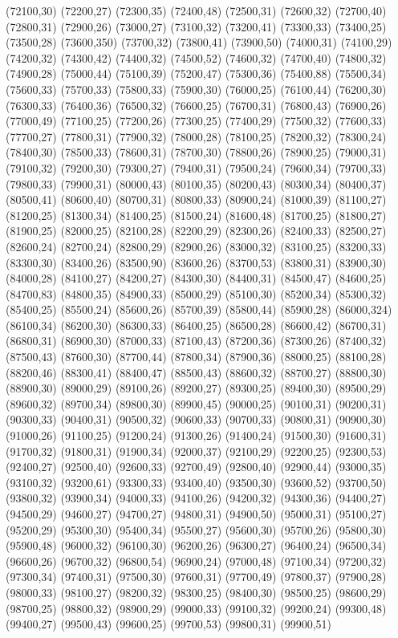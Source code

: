 (72100,30)
(72200,27)
(72300,35)
(72400,48)
(72500,31)
(72600,32)
(72700,40)
(72800,31)
(72900,26)
(73000,27)
(73100,32)
(73200,41)
(73300,33)
(73400,25)
(73500,28)
(73600,350)
(73700,32)
(73800,41)
(73900,50)
(74000,31)
(74100,29)
(74200,32)
(74300,42)
(74400,32)
(74500,52)
(74600,32)
(74700,40)
(74800,32)
(74900,28)
(75000,44)
(75100,39)
(75200,47)
(75300,36)
(75400,88)
(75500,34)
(75600,33)
(75700,33)
(75800,33)
(75900,30)
(76000,25)
(76100,44)
(76200,30)
(76300,33)
(76400,36)
(76500,32)
(76600,25)
(76700,31)
(76800,43)
(76900,26)
(77000,49)
(77100,25)
(77200,26)
(77300,25)
(77400,29)
(77500,32)
(77600,33)
(77700,27)
(77800,31)
(77900,32)
(78000,28)
(78100,25)
(78200,32)
(78300,24)
(78400,30)
(78500,33)
(78600,31)
(78700,30)
(78800,26)
(78900,25)
(79000,31)
(79100,32)
(79200,30)
(79300,27)
(79400,31)
(79500,24)
(79600,34)
(79700,33)
(79800,33)
(79900,31)
(80000,43)
(80100,35)
(80200,43)
(80300,34)
(80400,37)
(80500,41)
(80600,40)
(80700,31)
(80800,33)
(80900,24)
(81000,39)
(81100,27)
(81200,25)
(81300,34)
(81400,25)
(81500,24)
(81600,48)
(81700,25)
(81800,27)
(81900,25)
(82000,25)
(82100,28)
(82200,29)
(82300,26)
(82400,33)
(82500,27)
(82600,24)
(82700,24)
(82800,29)
(82900,26)
(83000,32)
(83100,25)
(83200,33)
(83300,30)
(83400,26)
(83500,90)
(83600,26)
(83700,53)
(83800,31)
(83900,30)
(84000,28)
(84100,27)
(84200,27)
(84300,30)
(84400,31)
(84500,47)
(84600,25)
(84700,83)
(84800,35)
(84900,33)
(85000,29)
(85100,30)
(85200,34)
(85300,32)
(85400,25)
(85500,24)
(85600,26)
(85700,39)
(85800,44)
(85900,28)
(86000,324)
(86100,34)
(86200,30)
(86300,33)
(86400,25)
(86500,28)
(86600,42)
(86700,31)
(86800,31)
(86900,30)
(87000,33)
(87100,43)
(87200,36)
(87300,26)
(87400,32)
(87500,43)
(87600,30)
(87700,44)
(87800,34)
(87900,36)
(88000,25)
(88100,28)
(88200,46)
(88300,41)
(88400,47)
(88500,43)
(88600,32)
(88700,27)
(88800,30)
(88900,30)
(89000,29)
(89100,26)
(89200,27)
(89300,25)
(89400,30)
(89500,29)
(89600,32)
(89700,34)
(89800,30)
(89900,45)
(90000,25)
(90100,31)
(90200,31)
(90300,33)
(90400,31)
(90500,32)
(90600,33)
(90700,33)
(90800,31)
(90900,30)
(91000,26)
(91100,25)
(91200,24)
(91300,26)
(91400,24)
(91500,30)
(91600,31)
(91700,32)
(91800,31)
(91900,34)
(92000,37)
(92100,29)
(92200,25)
(92300,53)
(92400,27)
(92500,40)
(92600,33)
(92700,49)
(92800,40)
(92900,44)
(93000,35)
(93100,32)
(93200,61)
(93300,33)
(93400,40)
(93500,30)
(93600,52)
(93700,50)
(93800,32)
(93900,34)
(94000,33)
(94100,26)
(94200,32)
(94300,36)
(94400,27)
(94500,29)
(94600,27)
(94700,27)
(94800,31)
(94900,50)
(95000,31)
(95100,27)
(95200,29)
(95300,30)
(95400,34)
(95500,27)
(95600,30)
(95700,26)
(95800,30)
(95900,48)
(96000,32)
(96100,30)
(96200,26)
(96300,27)
(96400,24)
(96500,34)
(96600,26)
(96700,32)
(96800,54)
(96900,24)
(97000,48)
(97100,34)
(97200,32)
(97300,34)
(97400,31)
(97500,30)
(97600,31)
(97700,49)
(97800,37)
(97900,28)
(98000,33)
(98100,27)
(98200,32)
(98300,25)
(98400,30)
(98500,25)
(98600,29)
(98700,25)
(98800,32)
(98900,29)
(99000,33)
(99100,32)
(99200,24)
(99300,48)
(99400,27)
(99500,43)
(99600,25)
(99700,53)
(99800,31)
(99900,51)
